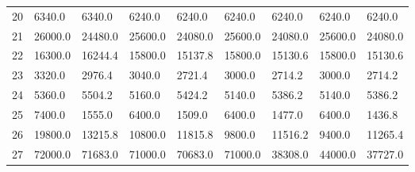 \begin{tabular}{|r|l|l|l|l|l|l|l|l|}
  20 & 6340.0 & 6340.0 & 6240.0 & 6240.0 & 6240.0 & 6240.0 & 6240.0 & 6240.0 \\ 
  21 & 26000.0 & 24480.0 & 25600.0 & 24080.0 & 25600.0 & 24080.0 & 25600.0 & 24080.0 \\ 
  22 & 16300.0 & 16244.4 & 15800.0 & 15137.8 & 15800.0 & 15130.6 & 15800.0 & 15130.6 \\ 
  23 & 3320.0 & 2976.4 & 3040.0 & 2721.4 & 3000.0 & 2714.2 & 3000.0 & 2714.2 \\ 
  24 & 5360.0 & 5504.2 & 5160.0 & 5424.2 & 5140.0 & 5386.2 & 5140.0 & 5386.2 \\ 
  25 & 7400.0 & 1555.0 & 6400.0 & 1509.0 & 6400.0 & 1477.0 & 6400.0 & 1436.8 \\ 
  26 & 19800.0 & 13215.8 & 10800.0 & 11815.8 & 9800.0 & 11516.2 & 9400.0 & 11265.4 \\ 
  27 & 72000.0 & 71683.0 & 71000.0 & 70683.0 & 71000.0 & 38308.0 & 44000.0 & 37727.0 \\ 
\end{tabular}
